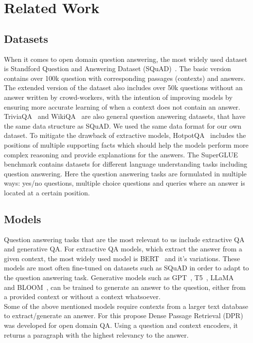 \documentclass[fleqn,moreauthors,10pt]{ds_report}
\begin{document}
\section*{Related Work}

\subsection*{Datasets}
When it comes to open domain question answering, the most widely used dataset is Standford Question and Answering Dataset (SQuAD)~\cite{rajpurkar2016squad, rajpurkar2018squadv2}.
The basic version contains over 100k question with corresponding passages (contexts) and answers.
The extended version of the dataset also includes over 50k questions without an answer written by crowd-workers, with the intention of improving models by ensuring more accurate learning of when a context does not contain an answer.
TriviaQA~\cite{joshi2017triviaqa} and WikiQA~\cite{yang2015wikiqa} are also general question answering datasets, that have the same data structure as SQuAD.
We used the same data format for our own dataset. 
To mitigate the drawback of extractive models, HotpotQA~\cite{yang2018hotpotqa} includes the positions of multiple supporting facts which should help the models perform more complex reasoning and provide explanations for the answers.
The SuperGLUE~\cite{SuperGLUE} benchmark contains datasets for different language understanding tasks including question answering. 
Here the question answering tasks are formulated in multiple ways: yes/no questions, multiple choice questions and queries where an answer is located at a certain position.

\subsection*{Models}
Question answering tasks that are the most relevant to us include extractive QA and generative QA.
For extractive QA models, which extract the answer from a given context, the most widely used model is BERT~\cite{devlin2019bert} and it's variations.
These models are most often fine-tuned on datasets such as SQuAD in order to adapt to the question answering task.
Generative models such as GPT~\cite{openai2023gpt4}, T5~\cite{T5}, LLaMA~\cite{touvron2023llama} and BLOOM~\cite{scao2022bloom}, can be trained to generate an answer to the question, either from a provided context or without a context whatsoever. \\
Some of the above mentioned models require contexts from a larger text database to extract/generate an answer. 
For this propose Dense Passage Retrieval (DPR) \cite{karpukhin2020dense} was developed for open domain QA. 
Using a question and context encoders, it returns a paragraph with the highest relevancy to the answer.
\end{document}
